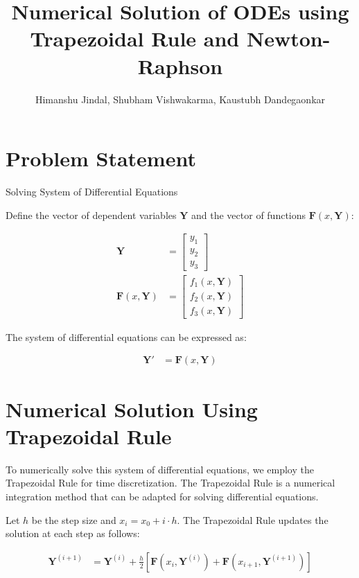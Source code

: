 \documentclass{article}
\title{Numerical Solution of ODEs using Trapezoidal Rule and Newton-Raphson}
\author{Himanshu Jindal, Shubham Vishwakarma, Kaustubh Dandegaonkar}
\date{}
\begin{document}
\maketitle

\section*{Problem Statement}
Solving System of Differential Equations

Define the vector of dependent variables $\mathbf{Y}$ and the vector of functions $\mathbf{F}(x, \mathbf{Y})$:

\begin{align}
    \mathbf{Y} &= \begin{bmatrix} y_{1} \\ y_{2} \\ y_{3} \end{bmatrix} \\
    \mathbf{F}(x, \mathbf{Y}) &= \begin{bmatrix} f_1(x, \mathbf{Y}) \\ f_2(x, \mathbf{Y}) \\ f_3(x, \mathbf{Y}) \end{bmatrix}
\end{align}


The system of differential equations can be expressed as:

\begin{align}
    \textbf{Y}' &= \mathbf{F}(x, \mathbf{Y})
\end{align}

\section*{Numerical Solution Using Trapezoidal Rule}

To numerically solve this system of differential equations, we employ the Trapezoidal Rule for time discretization. The Trapezoidal Rule is a numerical integration method that can be adapted for solving differential equations.

Let $h$ be the step size and $x_i = x_0 + i \cdot h$. The Trapezoidal Rule updates the solution at each step as follows:

\begin{align}
    \mathbf{Y}^{(i+1)} &= \mathbf{Y}^{(i)} + \frac{h}{2} \left[ \mathbf{F}(x_i, \mathbf{Y}^{(i)}) + \mathbf{F}(x_{i+1}, \mathbf{Y}^{(i+1)}) \right]
\end{align}
\end{document}
